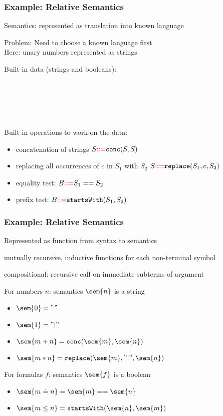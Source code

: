 \begin{frame}\frametitle{Example: Relative Semantics}
Semantics: represented as translation into known language
\medskip

Problem: Need to choose a known language first\\
Here: unary numbers represented as strings

Built-in data (strings and booleans):
\begin{commgrammar}
\\
\\
\\
\\
\end{commgrammar}

Built-in operations to work on the data:
\begin{itemize}
\item concatenation of strings $S\bbc \cn{conc}(S,S)$
\item replacing all occurrences of $c$ in $S_1$ with $S_2$ $S\bbc \cn{replace}(S_1,c,S_2)$
\item equality test: $B{\color{red}::=} S_1==S_2$
\item prefix test: $B\bbc \cn{startsWith}(S_1,S_2)$
\end{itemize}
\end{frame}

\begin{frame}\frametitle{Example: Relative Semantics}
\begin{blockitems}{Represented as function from syntax to semantics}
\item mutually recursive, inductive functions for each non-terminal symbol
\item compositional: recursive call on immediate subterms of argument
\end{blockitems}

For numbers $n$: semantics $\sem{n}$ is a string
\begin{itemize}
\item $\sem{0}=""$
\item $\sem{1}="|"$
\item $\sem{m+n}=\cn{conc}(\sem{m},\sem{n})$
\item $\sem{m*n}=\cn{replace}(\sem{m},"|",\sem{n})$
\end{itemize}
\medskip

For formulas $f$: semantics $\sem{f}$ is a boolean
\begin{itemize}
\item $\sem{m\doteq n}=\sem{m}==\sem{n}$
\item $\sem{m\leq n}=\cn{startsWith}(\sem{n},\sem{m})$
\end{itemize}
\end{frame}

